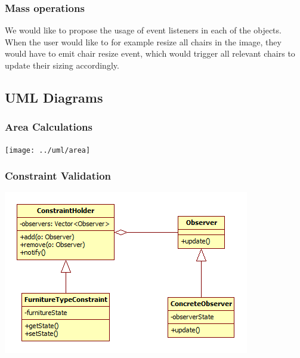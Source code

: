 \subsubsection{Mass operations}
We would like to propose the usage of event listeners in each of the objects. When the user would like to for example resize all chairs in the image, they would have to emit chair resize event, which would trigger all relevant chairs to update their sizing accordingly.


\subsection{UML Diagrams}

\subsubsection{Area Calculations}

\texttt{[image: ../uml/area]}

\subsubsection{Constraint Validation}

\includegraphics[width=\textwidth]{../uml/constraint.png}
